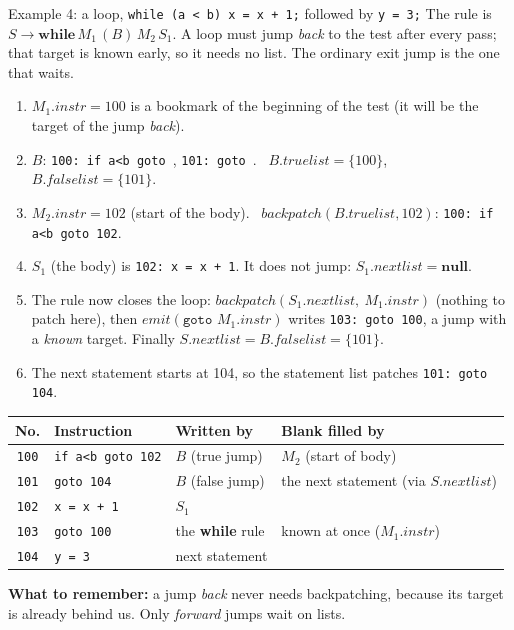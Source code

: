 \documentclass[11pt,a4paper]{article}
\begin{document}
\begin{examplebox}{Example 4: a loop, \texttt{while (a < b) x = x + 1;} followed by \texttt{y = 3;}}
The rule is $S\to\mathbf{while}\,M_1\,(B)\,M_2\,S_1$. A loop must jump \emph{back} to the test after every pass; that target is known early, so it needs no list. The ordinary exit jump is the one that waits.
\begin{enumerate}[nosep]
\item $M_1.instr=100$ is a bookmark of the beginning of the test (it will be the target of the jump \emph{back}).
\item $B$: \texttt{100: if a<b goto \blk}, \texttt{101: goto \blk}. \ $B.truelist=\{100\}$, $B.falselist=\{101\}$.
\item $M_2.instr=102$ (start of the body). \ $\mathit{backpatch}(B.truelist,102)$: \texttt{100: if a<b goto 102}.
\item $S_1$ (the body) is \texttt{102: x = x + 1}. It does not jump: $S_1.nextlist=\mathbf{null}$.
\item The rule now closes the loop: $\mathit{backpatch}(S_1.nextlist,\ M_1.instr)$ (nothing to patch here), then $\mathit{emit}(\texttt{goto }M_1.instr)$ writes \texttt{103: goto 100}, a jump with a \emph{known} target. Finally $S.nextlist=B.falselist=\{101\}$.
\item The next statement starts at 104, so the statement list patches \texttt{101: goto 104}.
\end{enumerate}
\begin{center}
\small
\begin{tabular}{@{}c l l l@{}}
\toprule
\textbf{No.} & \textbf{Instruction} & \textbf{Written by} & \textbf{Blank filled by} \\ \midrule
\texttt{100} & \texttt{if a<b goto 102} & $B$ (true jump)  & $M_2$ (start of body) \\
\texttt{101} & \texttt{goto 104}        & $B$ (false jump) & the next statement (via $S.nextlist$) \\
\texttt{102} & \texttt{x = x + 1}       & $S_1$ & \\
\texttt{103} & \texttt{goto 100}        & the \textbf{while} rule & known at once ($M_1.instr$) \\
\texttt{104} & \texttt{y = 3}           & next statement & \\ \bottomrule
\end{tabular}
\end{center}
\textbf{What to remember:} a jump \emph{back} never needs backpatching, because its target is already behind us. Only \emph{forward} jumps wait on lists.
\end{examplebox}
\end{document}
